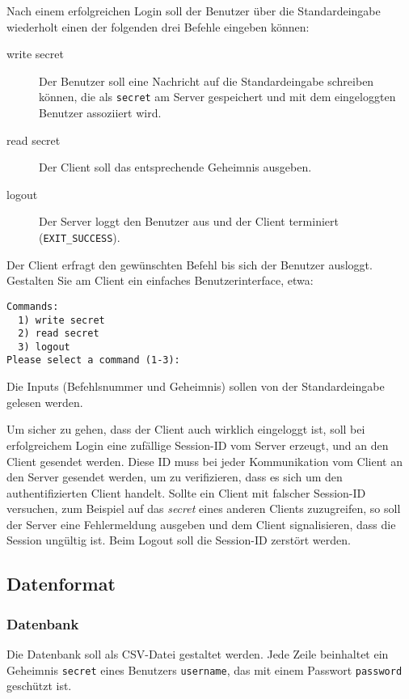 Nach einem erfolgreichen Login soll der Benutzer über die Standardeingabe
wiederholt einen der folgenden drei Befehle eingeben können:

\begin{description}
  \item[write secret] Der Benutzer soll eine Nachricht auf die Standardeingabe
    schreiben können, die als \texttt{secret} am Server gespeichert und mit dem
    eingeloggten Benutzer assoziiert wird.
  \item[read secret] Der Client soll das entsprechende Geheimnis
    ausgeben.
  \item[logout] Der Server loggt den Benutzer aus und der Client terminiert
    (\texttt{EXIT\_SUCCESS}).
\end{description}

Der Client erfragt den gewünschten Befehl bis sich der Benutzer ausloggt.
Gestalten Sie am Client ein einfaches Benutzerinterface, etwa:
\begin{verbatim}
Commands:
  1) write secret
  2) read secret
  3) logout
Please select a command (1-3):
\end{verbatim}

Die Inputs (Befehlsnummer und Geheimnis) sollen von der Standardeingabe
gelesen werden.

Um sicher zu gehen, dass der Client auch wirklich eingeloggt ist, soll bei
erfolgreichem Login eine zufällige Session-ID vom Server erzeugt, und an den
Client gesendet werden. Diese ID muss bei jeder Kommunikation vom Client an den
Server gesendet werden, um zu verifizieren, dass es sich um den
authentifizierten Client handelt.  Sollte ein Client mit falscher Session-ID
versuchen, zum Beispiel auf das \textit{secret} eines anderen Clients
zuzugreifen, so soll der Server eine Fehlermeldung ausgeben und dem Client
signalisieren, dass die Session ungültig ist.  Beim Logout soll die Session-ID
zerstört werden.


\subsection*{Datenformat}

\subsubsection*{Datenbank}

Die Datenbank soll als CSV-Datei gestaltet werden. Jede Zeile beinhaltet ein
Geheimnis \texttt{secret} eines Benutzers \texttt{username}, das mit einem
Passwort \texttt{password} geschützt ist.

